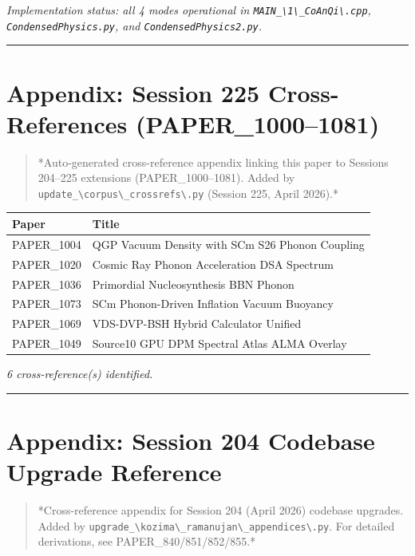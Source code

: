 \documentclass[12pt,a4paper]{article}
\begin{document}
\emph{Implementation status: all 4 modes operational in \texttt{MAIN\_\textbackslash {1\textbackslash \_CoAnQi\textbackslash }.cpp}, \texttt{CondensedPhysics.py}, and \texttt{CondensedPhysics2.py}.}

\medskip\hrule\medskip

\section{Appendix: Session 225 Cross-References (PAPER\_1000--1081)}

\begin{quote}
*Auto-generated cross-reference appendix linking this paper to
Sessions 204--225 extensions (PAPER\_1000--1081). Added by
\texttt{update\_\textbackslash {corpus\textbackslash \_crossrefs\textbackslash }.py} (Session 225, April 2026).*
\end{quote}

\begin{table}[H]
\centering
\small
\begin{tabularx}{\linewidth}{@{}>{\raggedright\arraybackslash}X>{\raggedright\arraybackslash}X@{}}
\toprule
Paper & Title \tabularnewline
\midrule
PAPER\_1004 & QGP Vacuum Density with SCm S26 Phonon Coupling \tabularnewline
PAPER\_1020 & Cosmic Ray Phonon Acceleration DSA Spectrum \tabularnewline
PAPER\_1036 & Primordial Nucleosynthesis BBN Phonon \tabularnewline
PAPER\_1073 & SCm Phonon-Driven Inflation Vacuum Buoyancy \tabularnewline
PAPER\_1069 & VDS-DVP-BSH Hybrid Calculator Unified \tabularnewline
PAPER\_1049 & Source10 GPU DPM Spectral Atlas ALMA Overlay \tabularnewline
\bottomrule
\end{tabularx}
\end{table}

\emph{6 cross-reference(s) identified.}

\medskip\hrule\medskip

\section{Appendix: Session 204 Codebase Upgrade Reference}

\begin{quote}
*Cross-reference appendix for Session 204 (April 2026) codebase upgrades.
Added by \texttt{upgrade\_\textbackslash {kozima\textbackslash \_ramanujan\textbackslash \_appendices\textbackslash }.py}. For detailed derivations,
see PAPER\_840/851/852/855.*
\end{quote}
\end{document}
